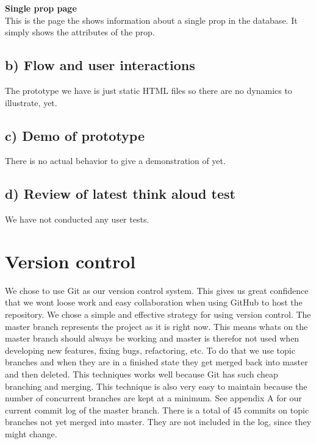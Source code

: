 \documentclass[12pt]{article}
\begin{document}
\newline
\textbf{Single prop page}\\
This is the page the shows information about a single prop in the database. It simply shows the attributes of the prop.
\subsection{b) Flow and user interactions}
The prototype we have is just static HTML files so there are no dynamics to illustrate, yet.
\subsection{c) Demo of prototype}
There is no actual behavior to give a demonstration of yet.
\subsection{d) Review of latest think aloud test}
We have not conducted any user tests.
\section{Version control}
We chose to use Git as our version control system. This gives us great confidence that we wont loose work and easy collaboration when using GitHub to host the repository.
\newline
\newline
We chose a simple and effective strategy for using version control. The master branch represents the project as it is right now. This means whats on the master branch should always be working and master is therefor not used when developing new features, fixing bugs, refactoring, etc. To do that we use topic branches and when they are in a finished state they get merged back into master and then deleted. This techniques works well because Git has such cheap branching and merging. This technique is also very easy to maintain because the number of concurrent branches are kept at a minimum.
\newline
\newline
See appendix A for our current commit log of the master branch. There is a total of 45 commits on topic branches not yet merged into master. They are not included in the log, since they might change.
\end{document}
